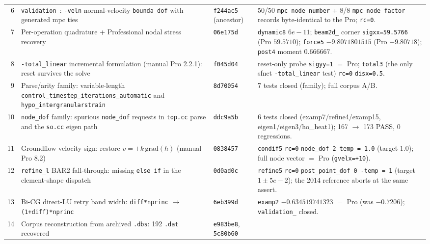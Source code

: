 \documentclass[11pt,a4paper]{report}
\newcommand{\code}[1]{\texttt{#1}}
\begin{document}
\begin{longtable}{@{}r L{5.0cm} L{2.6cm} L{5.6cm}@{}}
6 & \code{validation\_}: \code{-veln} normal-velocity \code{bounda\_\allowbreak dof} with
    generated mpc ties
  & \code{f244ac5} (ancestor)
  & 50/50 \code{mpc\_\allowbreak node\_\allowbreak number} + 8/8 \code{mpc\_\allowbreak node\_\allowbreak factor} records
    byte-identical to the Pro; \code{rc=0}. \\
7 & Per-operation quadrature + Professional nodal stress recovery
  & \code{06e175d}
  & \code{dynamic8} $6e-11$; \code{beam2d\_} corner \code{sigxx=59.5766} (Pro
    $59.5710$); \code{force5} $-9.8071801515$ (Pro $-9.80718$); \code{post4}
    moment $0.666667$. \\
8 & \code{-total\_\allowbreak linear} incremental formulation (manual Pro 2.2.1): reset
    survives the solve
  & \code{f045d04}
  & reset-only probe \code{sigyy=1} $=$ Pro; \code{total3} (the only sfnet
    \code{-total\_\allowbreak linear} test) \code{rc=0} \code{disx=0.5}. \\
9 & Parse/arity family: variable-length
    \code{control\_\allowbreak timestep\_\allowbreak iterations\_\allowbreak automatic} and
    \code{hypo\_\allowbreak intergranularstrain}
  & \code{8d70054}
  & 7 tests closed (family); full corpus A/B. \\
10 & \code{node\_\allowbreak dof} family: spurious \code{node\_\allowbreak dof} requests in \code{top.cc}
     parse and the \code{so.cc} eigen path
  & \code{ddc9a5b}
  & 6 tests closed (examp7/refine4/examp15, eigen1/eigen3/ho\_heat1); 167
    $\rightarrow$ 173 PASS, 0 regressions. \\
11 & Groundflow velocity sign: restore $v = +k\,\mathrm{grad}(h)$ (manual Pro
     8.2)
  & \code{0838457}
  & \code{condif5} \code{rc=0} \code{node\_\allowbreak dof 2 temp = 1.0} (target $1.0$);
    full node vector $=$ Pro (\code{gvelx=+10}). \\
12 & \code{refine\_\allowbreak l} BAR2 fall-through: missing \code{else if} in the
     element-shape dispatch
  & \code{0d0ad0c}
  & \code{refine5} \code{rc=0} \code{post\_\allowbreak point\_\allowbreak dof 0 -temp = 1} (target $1 \pm
    5e-2$); the 2014 reference aborts at the same assert. \\
13 & Bi-CG direct-LU retry band width: \code{diff*nprinc} $\rightarrow$
     \code{(1+diff)*nprinc}
  & \code{6eb399d}
  & \code{examp2} $-0.634519741323$ $=$ Pro (was $-0.7206$); \code{validation\_}
    closed. \\
14 & Corpus reconstruction from archived \code{.dbs}: 192 \code{.dat} recovered
  & \code{e983be8}, \code{5c80b60}

\end{longtable}
\end{document}
